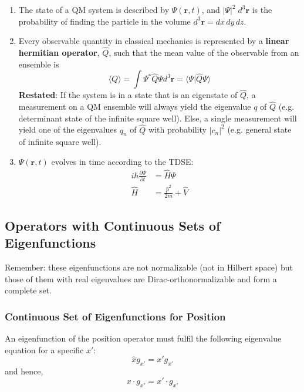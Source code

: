 \begin{enumerate}
    \item The state of a QM system is described by $\Psi(\mathbf{r},t)$, and $|\Psi|^2\; d^3 \mathbf{r}$ is the probability of finding the particle in the volume $d^3 \mathbf{r} = dx\,dy\,dz$.
    \item Every observable quantity in classical mechanics is represented by a \textbf{linear hermitian operator}, $\hat{Q}$, such that the mean value of the observable from an ensemble is
          \noindent\begin{equation*}
              \langle Q\rangle=\int\Psi^{*}\hat{Q}\Psi d^{3} \mathbf{r}= \langle\Psi|\hat{Q}\Psi\rangle
          \end{equation*}\newline
          \textbf{Restated}:
          If the system is in a state that is an eigenstate of $\hat{Q}$, a measurement on a QM ensemble will always yield the eigenvalue $q$ of $\hat{Q}$ (e.g. determinant state of the infinite square well).
          Else, a single measurement will yield one of the eigenvalues $q_n$ of $\hat{Q}$ with probability $|c_n|^2$ (e.g. general state of infinite square well).
    \item $\Psi(\mathbf{r},t)$ evolves in time according to the TDSE:
          \noindent\begin{align*}
              i\hbar \frac{\partial \Psi}{\partial t} & =\hat{H}\Psi                     \\
              \hat{H}                                 & = \frac{\hat{p}^2}{2m} + \hat{V}
          \end{align*}
\end{enumerate}

\subsection{Operators with Continuous Sets of Eigenfunctions}
Remember: these eigenfunctions are not normalizable (not in Hilbert space) but those of them with real eigenvalues are Dirac-orthonormalizable and form a complete set.

\subsubsection{Continuous Set of Eigenfunctions for Position}


An eigenfunction of the position operator must fulfil the following eigenvalue equation for a specific $x'$:
\begin{equation*}
    \hat{x}g_{x'} =x'g_{x'}
\end{equation*}
and hence,
\begin{equation*}
    x \cdot g_{x'} =x' \cdot g_{x'}
\end{equation*}


